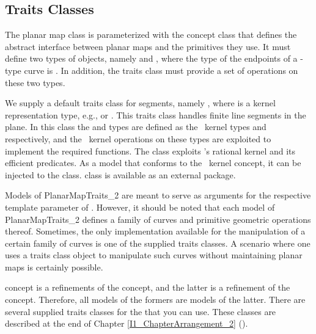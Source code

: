 \subsection{Traits Classes}
The planar map class is parameterized with the concept class
 that defines the abstract interface
between planar maps and the primitives they use. It must define two
types of objects, namely  and
, where the type of the endpoints of a
-type curve is . In
addition, the traits class must provide a set of operations on these
two types.
					  
We supply a default traits class for segments, namely
, where  is a
kernel representation type, e.g.,  or
. This traits class handles finite line segments in
the plane. In this class the
 and  types are
defined as the \cgal\ kernel types
 and 
respectively, and the \cgal\ kernel operations on these types are
exploited to implement the required functions.
The  class exploits \leda 's rational
kernel and its efficient predicates. As a model that conforms to the
\cgal\ kernel concept, it can be injected to the
 class.
 class is available as an external
package.

Models of PlanarMapTraits\_2 are meant to serve as arguments for the
respective template parameter of
. However, it should be noted
that each model of PlanarMapTraits\_2 defines a family of curves and
primitive geometric operations thereof. Sometimes, the only
implementation available for the manipulation of a certain family of
curves is one of the supplied traits classes. A scenario where one
uses a traits class object to manipulate such curves without
maintaining planar maps is certainly possible.

 concept is a refinements of the
 concept, and the latter is a
refinement of the  concept.
Therefore, all models of the formers are models of the latter. 
There are several supplied traits classes for the 
that you can use. These classes are described at the end of Chapter
\ref{I1_ChapterArrangement_2} ().


